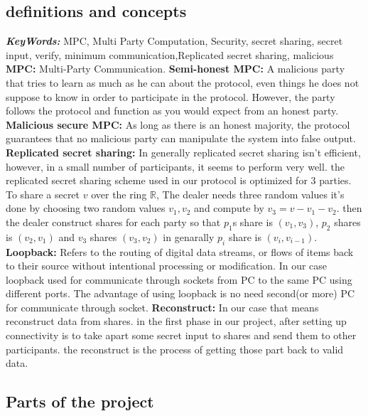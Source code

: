 \documentclass[12pt]{article}
\providecommand{\keywords}[1]{\textbf{\textit{KeyWords:}} #1}
\begin{document}
\subsection{definitions and concepts}
\keywords{MPC, Multi Party Computation, Security, secret sharing, secret input, verify, minimum communication,Replicated secret sharing, malicious}\hfill\break\hfill\break
\textbf{MPC:} Multi-Party Communication.\hfill\break\hfill\break
\textbf{Semi-honest MPC:} A malicious party that tries to learn as much as he can about the protocol, even things he does not suppose to know in order to participate in the protocol. However, the party follows the protocol and function as you would expect from an honest party.\hfill\break\hfill\break
\textbf{Malicious secure MPC:} As long as there is an honest majority, the protocol guarantees that no malicious party can manipulate the system into false output. \hfill\break \hfill\break
\textbf{Replicated secret sharing:} In generally replicated secret sharing isn’t efficient, however, in a small number of participants, it seems to perform very well. the replicated secret sharing scheme used in our protocol is optimized for 3 parties. \hfill\break
To share a secret $v$ over the ring $\mathbb{R}$, The dealer needs three random values it’s done by choosing two random values $v_1, v_2$ and compute by $v_3 = v - v_1 - v_2$. then the dealer construct shares for each party so that $p_1$s share is $(v_1,v_3)$, $p_2$ shares is $(v_2,v_1)$ and $v_3$ shares $(v_3,v_2)$ in genarally $p_i$ share is $(v_i,v_{i-1})$.
\hfill\break\hfill\break
\textbf{Loopback:} Refers to the routing of digital data streams, or flows of items back to their source without intentional processing or modification. In our case loopback used for communicate through sockets from PC to the same PC using different ports. The advantage of using loopback is no need second(or more) PC for communicate through socket.
\hfill\break\hfill\break
\textbf{Reconstruct:} In our case that means reconstruct data from shares. in the first phase in our project, after setting up connectivity is to take apart some secret input to shares and send them to other participants. the reconstruct is the process of getting those part back to valid data.  

\subsection{Parts of the project}
\end{document}
